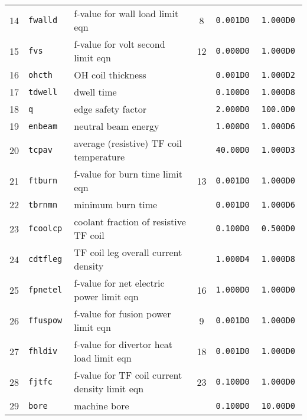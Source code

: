 \documentclass[11pt,a4paper]{report}
\begin{document}
\begin{table}[tbph]
\begin{center}
\begin{tabular}{||c|l|l|c|c|c||}
14  & \tt fwalld      & f-value for wall load limit eqn                         & 8         & \tt 0.001D0  & \tt 1.000D0 \\
15  & \tt fvs         & f-value for volt second limit eqn                       & 12        & \tt 0.000D0  & \tt 1.000D0 \\
16  & \tt ohcth       & OH coil thickness                                       &           & \tt 0.001D0  & \tt 1.000D2 \\
17  & \tt tdwell      & dwell time                                              &           & \tt 0.100D0  & \tt 1.000D8 \\
18  & \tt q           & edge safety factor                                      &           & \tt 2.000D0  & \tt 100.0D0 \\
19  & \tt enbeam      & neutral beam energy                                     &           & \tt 1.000D0  & \tt 1.000D6 \\
20  & \tt tcpav       & average (resistive) TF coil temperature                 &           & \tt 40.00D0  & \tt 1.000D3 \\
21  & \tt ftburn      & f-value for burn time limit eqn                         & 13        & \tt 0.001D0  & \tt 1.000D0 \\
22  & \tt tbrnmn      & minimum burn time                                       &           & \tt 0.001D0  & \tt 1.000D6 \\
23  & \tt fcoolcp     & coolant fraction of resistive TF coil                   &           & \tt 0.100D0  & \tt 0.500D0 \\
24  & \tt cdtfleg     & TF coil leg overall current density                     &           & \tt 1.000D4  & \tt 1.000D8 \\
25  & \tt fpnetel     & f-value for net electric power limit eqn                & 16        & \tt 1.000D0  & \tt 1.000D0 \\
26  & \tt ffuspow     & f-value for fusion power limit eqn                      & 9         & \tt 0.001D0  & \tt 1.000D0 \\
27  & \tt fhldiv      & f-value for divertor heat load limit eqn                & 18        & \tt 0.001D0  & \tt 1.000D0 \\
28  & \tt fjtfc       & f-value for TF coil current density limit eqn           & 23        & \tt 0.100D0  & \tt 1.000D0 \\
29  & \tt bore        & machine bore                                            &           & \tt 0.100D0  & \tt 10.00D0 \\

\end{tabular}
\end{center}
\end{table}
\end{document}
